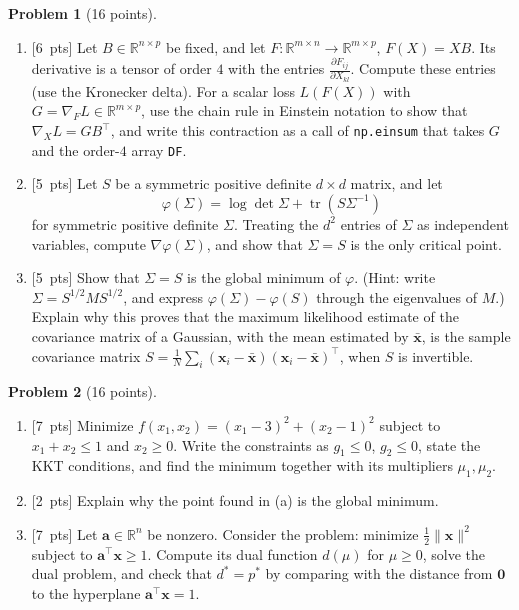 \documentclass[11pt]{article}
\theoremstyle{definition}
\newtheorem{problem}{Problem}
\newcommand{\norm}[1]{\lVert #1 \rVert}
\newcommand{\pts}[1]{\textup{[#1~pts]}}
\DeclareMathOperator{\tr}{tr}
\begin{document}
\begin{problem}[16 points]\label{pr:fin-matrix-calculus}
    \begin{enumerate}[label=(\alph*)]
        \item \pts{6} Let $B \in \mathbb{R}^{n \times p}$ be fixed, and let $F: \mathbb{R}^{m \times n} \to \mathbb{R}^{m \times p}$, $F(X) = XB$. Its derivative is a tensor of order $4$ with the entries $\frac{\partial F_{ij}}{\partial X_{kl}}$. Compute these entries (use the Kronecker delta). For a scalar loss $L(F(X))$ with $G = \nabla_F L \in \mathbb{R}^{m \times p}$, use the chain rule in Einstein notation to show that $\nabla_X L = GB^\top$, and write this contraction as a call of \texttt{np.einsum} that takes $G$ and the order-$4$ array \texttt{DF}.
        \item \pts{5} Let $S$ be a symmetric positive definite $d \times d$ matrix, and let
        \[\varphi(\Sigma) = \log\det\Sigma + \tr(S\Sigma^{-1})\]
        for symmetric positive definite $\Sigma$. Treating the $d^2$ entries of $\Sigma$ as independent variables, compute $\nabla\varphi(\Sigma)$, and show that $\Sigma = S$ is the only critical point.
        \item \pts{5} Show that $\Sigma = S$ is the global minimum of $\varphi$. (Hint: write $\Sigma = S^{1/2}MS^{1/2}$, and express $\varphi(\Sigma) - \varphi(S)$ through the eigenvalues of $M$.) Explain why this proves that the maximum likelihood estimate of the covariance matrix of a Gaussian, with the mean estimated by $\bar{\mathbf{x}}$, is the sample covariance matrix $S = \frac{1}{N}\sum_i(\mathbf{x}_i - \bar{\mathbf{x}})(\mathbf{x}_i - \bar{\mathbf{x}})^\top$, when $S$ is invertible.
    \end{enumerate}
\end{problem}

\begin{problem}[16 points]\label{pr:fin-kkt}
    \begin{enumerate}[label=(\alph*)]
        \item \pts{7} Minimize $f(x_1, x_2) = (x_1 - 3)^2 + (x_2 - 1)^2$ subject to $x_1 + x_2 \leq 1$ and $x_2 \geq 0$. Write the constraints as $g_1 \leq 0$, $g_2 \leq 0$, state the KKT conditions, and find the minimum together with its multipliers $\mu_1, \mu_2$.
        \item \pts{2} Explain why the point found in (a) is the global minimum.
        \item \pts{7} Let $\mathbf{a} \in \mathbb{R}^n$ be nonzero. Consider the problem: minimize $\frac{1}{2}\norm{\mathbf{x}}^2$ subject to $\mathbf{a}^\top\mathbf{x} \geq 1$. Compute its dual function $d(\mu)$ for $\mu \geq 0$, solve the dual problem, and check that $d^* = p^*$ by comparing with the distance from $\mathbf{0}$ to the hyperplane $\mathbf{a}^\top\mathbf{x} = 1$.
    \end{enumerate}
\end{problem}
\end{document}
